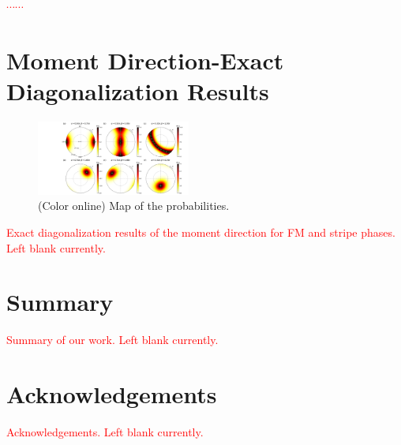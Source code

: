 \documentclass[aps,prb,reprint,groupedaddress,showpacs,amsfonts,amsmath,amssymb,superscriptaddress]{revtex4-1}
\begin{document}
\textcolor{red}{$\cdots \cdots$}

\section{Moment Direction-Exact Diagonalization Results}
\begin{figure}
    \includegraphics[width=0.45\textwidth]{Fig4.pdf}
    \caption{(Color online) Map of the probabilities.}
     \label{fig:Proabilities}
\end{figure}

\textcolor{red}{Exact diagonalization results of the moment direction for FM and stripe phases. Left blank currently.}

\section{Summary}
\textcolor{red}{Summary of our work. Left blank currently.}

\section{Acknowledgements}
\textcolor{red}{Acknowledgements. Left blank currently.}


\end{document}
